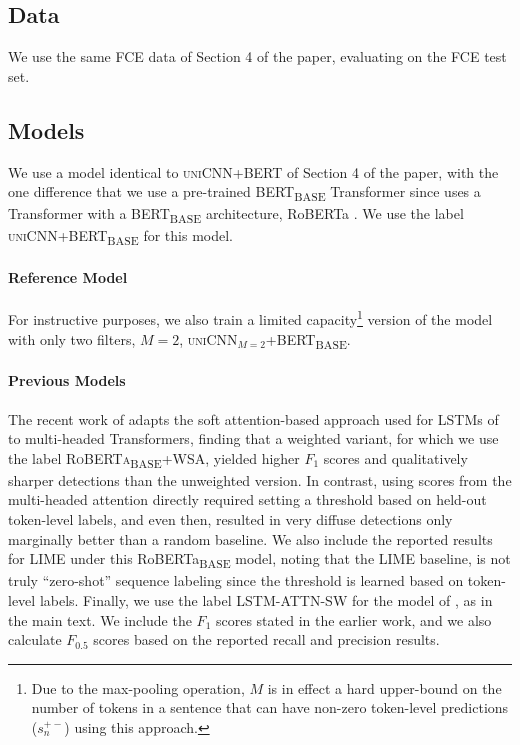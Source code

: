 \documentclass{clv3}
\begin{document}

\label{sec:fce-additional}
\subsection{Data} We use the same FCE data of Section 4 of the paper, evaluating on the FCE test set.

\subsection{Models} We use a model identical to \textsc{uniCNN+BERT} of Section 4 of the paper, with the one difference that we use a pre-trained BERT\textsubscript{BASE} Transformer since \citet{BujelEtAl-2021-Zeroshot-Weighted-Attention} uses a Transformer with a BERT\textsubscript{BASE} architecture, RoBERTa \cite{LiuEtAl-2019-RoBERTa}. We use the label \textsc{uniCNN+BERT\textsubscript{BASE}} for this model.

\paragraph{Reference Model}

For instructive purposes, we also train a limited capacity\footnote{Due to the max-pooling operation, $M$ is in effect a hard upper-bound on the number of tokens in a sentence that can have non-zero token-level predictions ($s^{+-}_n$) using this approach.} version of the model with only two filters, $M=2$, \textsc{uniCNN$_{M=2}$+BERT\textsubscript{BASE}}. 


\paragraph{Previous Models} The recent work of \citet{BujelEtAl-2021-Zeroshot-Weighted-Attention} adapts the soft attention-based approach used for LSTMs of \citet{ReiAndSogaard-2018-ZeroShotSeq} to multi-headed Transformers, finding that a weighted variant, for which we use the label \textsc{RoBERTa\textsubscript{BASE}+WSA}, yielded higher $F_1$ scores and qualitatively sharper detections than the unweighted version. In contrast, using scores from the multi-headed attention directly required setting a threshold based on held-out token-level labels, and even then, resulted in very diffuse detections only marginally better than a random baseline. We also include the reported results for \textsc{LIME} \cite{RibeiroEtal-2016-LIME} under this RoBERTa\textsubscript{BASE} model, noting that the \textsc{LIME} baseline, is not truly ``zero-shot'' sequence labeling since the threshold is learned based on token-level labels. Finally, we use the label \textsc{LSTM-ATTN-SW} for the model of \citet{ReiAndSogaard-2018-ZeroShotSeq}, as in the main text. We include the $F_1$ scores stated in the earlier work, and we also calculate $F_{0.5}$ scores based on the reported recall and precision results.
\end{document}
